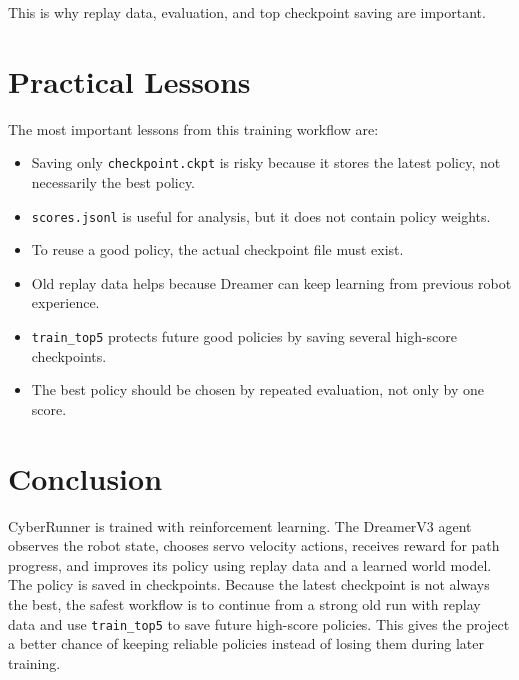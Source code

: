 \documentclass[11pt]{article}
\begin{document}
This is why replay data, evaluation, and top checkpoint saving are important.

\section{Practical Lessons}

The most important lessons from this training workflow are:

\begin{itemize}[leftmargin=*]
  \item Saving only \texttt{checkpoint.ckpt} is risky because it stores the latest policy, not necessarily the best policy.
  \item \texttt{scores.jsonl} is useful for analysis, but it does not contain policy weights.
  \item To reuse a good policy, the actual checkpoint file must exist.
  \item Old replay data helps because Dreamer can keep learning from previous robot experience.
  \item \texttt{train\_top5} protects future good policies by saving several high-score checkpoints.
  \item The best policy should be chosen by repeated evaluation, not only by one score.
\end{itemize}

\section{Conclusion}

CyberRunner is trained with reinforcement learning. The DreamerV3 agent observes the robot state, chooses servo velocity actions, receives reward for path progress, and improves its policy using replay data and a learned world model. The policy is saved in checkpoints. Because the latest checkpoint is not always the best, the safest workflow is to continue from a strong old run with replay data and use \texttt{train\_top5} to save future high-score policies. This gives the project a better chance of keeping reliable policies instead of losing them during later training.
\end{document}
